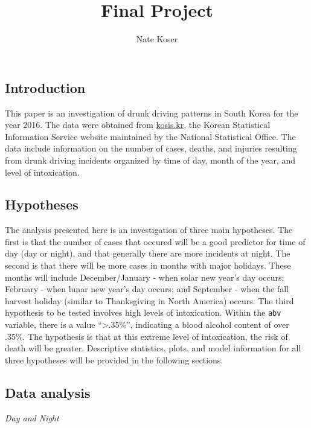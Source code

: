 \documentclass[floatsintext,man]{apa6}
\title{Final Project}
\author{Nate Koser}
\affiliation{
    \vspace{0.5cm}
          \textsuperscript{} Rutgers University  }
\theoremstyle{definition}
\theoremstyle{definition}
\theoremstyle{definition}
\theoremstyle{remark}
\begin{document}
\maketitle

\setcounter{secnumdepth}{0}



\subsection{Introduction}\label{introduction}

This paper is an investigation of drunk driving patterns in South Korea
for the year 2016. The data were obtained from
\href{http://kosis.kr/index/index.do}{kosis.kr}, the Korean Statistical
Information Service website maintained by the National Statistical
Office. The data include information on the number of cases, deaths, and
injuries resulting from drunk driving incidents organized by time of
day, month of the year, and level of intoxication.

\subsection{Hypotheses}\label{hypotheses}

The analysis presented here is an investigation of three main
hypotheses. The first is that the number of cases that occured will be a
good predictor for time of day (day or night), and that generally there
are more incidents at night. The second is that there will be more cases
in months with major holidays. These months will include
December/January - when solar new year's day occurs; February - when
lunar new year's day occurs; and September - when the fall harvest
holiday (similar to Thanksgiving in North America) occurs. The third
hypothesis to be tested involves high levels of intoxication. Within the
\texttt{abv} variable, there is a value \enquote{\textgreater{}.35\%},
indicating a blood alcohol content of over .35\%. The hypothesis is that
at this extreme level of intoxication, the risk of death will be
greater. Descriptive statistics, plots, and model information for all
three hypotheses will be provided in the following sections.

\subsection{Data analysis}\label{data-analysis}

\emph{Day and Night}
\end{document}
